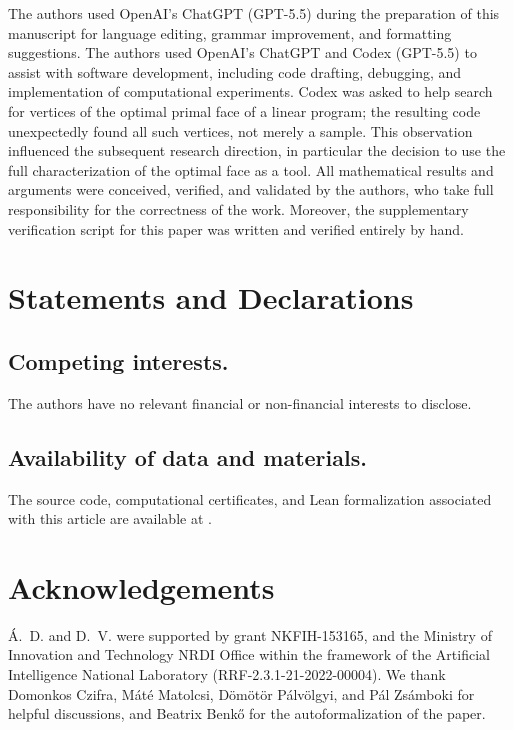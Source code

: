 \documentclass[pdflatex,sn-mathphys-num]{sn-jnl}%
\begin{document}
The authors used OpenAI's ChatGPT (GPT-5.5) during the preparation of this manuscript for language editing, grammar improvement, and formatting suggestions. The authors used OpenAI's ChatGPT and Codex (GPT-5.5) to assist with software development, including code drafting, debugging, and implementation of computational experiments. Codex was asked to help search for vertices of the optimal primal face of a linear program; the resulting code unexpectedly found all such vertices, not merely a sample. This observation influenced the subsequent research direction, in particular the decision to use the full characterization of the optimal face as a tool. All mathematical results and arguments were conceived, verified, and validated by the authors, who take full responsibility for the correctness of the work. Moreover, the supplementary verification script for this paper was written and verified entirely by hand.

\section*{Statements and Declarations}

\subsection{Competing interests.}
The authors have no relevant financial or non-financial interests to disclose.

\subsection{Availability of data and materials.}
The source code, computational certificates, and Lean formalization
associated with this article are available at \cite{supplementary}.

\section{Acknowledgements}

 Á.~D. and D.~V. were supported by grant NKFIH-153165, and the Ministry of Innovation and Technology NRDI Office within the framework of the Artificial Intelligence National Laboratory (RRF-2.3.1-21-2022-00004). We thank Domonkos Czifra, Máté Matolcsi, Dömötör Pálvölgyi, and Pál Zsámboki for helpful discussions, and Beatrix Benkő for the autoformalization of the paper.
\end{document}
